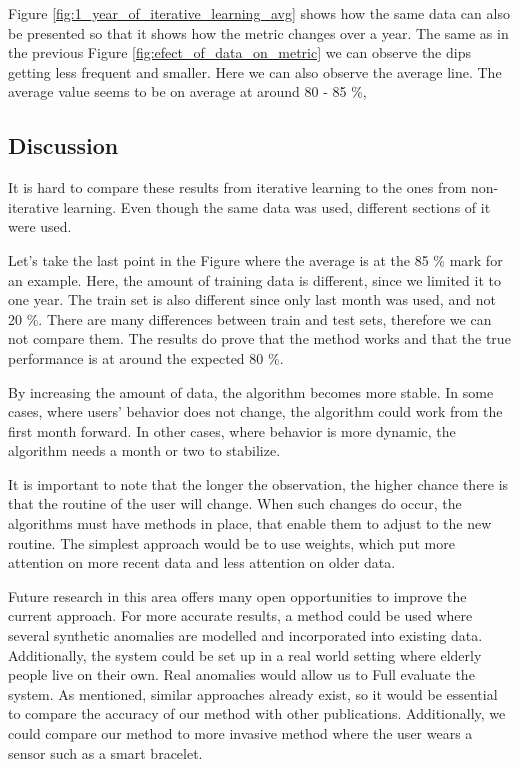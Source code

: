 Figure \ref{fig:1_year_of_iterative_learning_avg} shows how the same data can also be presented so that it shows how the metric changes over a year.
The same as in the previous Figure \ref{fig:efect_of_data_on_metric} we can observe the dips getting less frequent and smaller. 
Here we can also observe the average line. 
The average value seems to be on average at around 80 - 85 \%,

\subsection{Discussion}

It is hard to compare these results from iterative learning to the ones from non-iterative learning.
Even though the same data was used, different sections of it were used.

Let's take the last point in the Figure where the average is at the 85 \% mark for an example.
Here, the amount of training data is different, since we limited it to one year. 
The train set is also different since only last month was used, and not 20 \%. 
There are many differences between train and test sets, therefore we can not compare them.
The results do prove that the method works and that the true performance is at around the expected 80 \%.

By increasing the amount of data, the algorithm becomes more stable.
In some cases, where users' behavior does not change, the algorithm could work
from the first month forward. In other cases, where behavior is more dynamic, 
the algorithm needs a month or two to stabilize. 

It is important to note that the longer the observation, the higher chance there is
that the routine of the user will change.
When such changes do occur, the algorithms must have methods in place, that enable them to adjust to the new routine.
The simplest approach would be to use weights, which put more attention on more recent data and less attention on older data.

Future research in this area offers many open opportunities to improve the current approach. 
For more accurate results, a method could be used where several synthetic anomalies are modelled and incorporated into existing data. 
Additionally, the system could be set up in a real world setting where elderly people live on their own. 
Real anomalies would allow us to Full evaluate the system.
As mentioned, similar approaches already exist, so it would be essential to compare the accuracy of our method with other publications. 
Additionally, we could compare our method to more invasive method where the user wears a sensor such as a smart bracelet.


